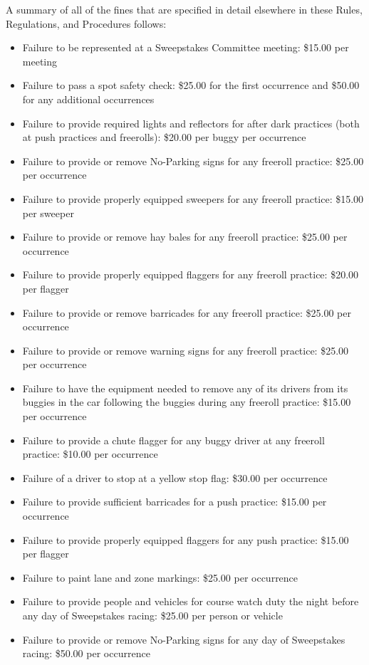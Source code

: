 \documentclass[openany]{book}
\begin{document}
A summary of all of the fines that are specified in detail elsewhere in these Rules, Regulations, and Procedures follows:
\begin{itemize}
	\item Failure to be represented at a Sweepstakes Committee meeting: \$15.00 per meeting
	\item Failure to pass a spot safety check: \$25.00 for the first occurrence and \$50.00 for any additional occurrences
	\item Failure to provide required lights and reflectors for after dark practices (both at push practices and freerolls): \$20.00 per buggy per occurrence
	\item Failure to provide or remove No-Parking signs for any freeroll practice: \$25.00 per occurrence
	\item Failure to provide properly equipped sweepers for any freeroll practice: \$15.00 per sweeper
	\item Failure to provide or remove hay bales for any freeroll practice: \$25.00 per occurrence
	\item Failure to provide properly equipped flaggers for any freeroll practice: \$20.00 per flagger
	\item Failure to provide or remove barricades for any freeroll practice: \$25.00 per occurrence
	\item Failure to provide or remove warning signs for any freeroll practice: \$25.00 per occurrence
	\item Failure to have the equipment needed to remove any of its drivers from its buggies in the car following the buggies during any freeroll practice: \$15.00 per occurrence
	\item Failure to provide a chute flagger for any buggy driver at any freeroll practice: \$10.00 per occurrence
	\item Failure of a driver to stop at a yellow stop flag: \$30.00 per occurrence
	\item Failure to provide sufficient barricades for a push practice: \$15.00 per occurrence
	\item Failure to provide properly equipped flaggers for any push practice: \$15.00 per flagger
	\item Failure to paint lane and zone markings: \$25.00 per occurrence
	\item Failure to provide people and vehicles for course watch duty the night before any day of Sweepstakes racing: \$25.00 per person or vehicle
	\item Failure to provide or remove No-Parking signs for any day of Sweepstakes racing: \$50.00 per occurrence

\end{itemize}
\end{document}
